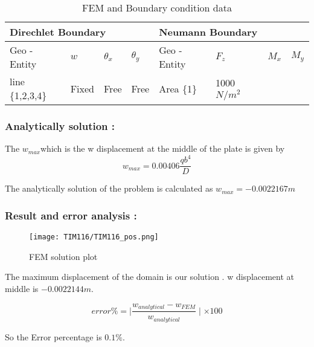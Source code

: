 \documentclass[VM.tex]{subfiles}
\begin{document}
\begin{table}[h!]
\renewcommand{\arraystretch}{1.5}
\centering
\caption{FEM and Boundary condition data}
\label{my-label}
\begin{tabular}{|l|lll|l|lll|}
\hline
 \multicolumn{4}{l|}{\cellcolor[HTML]{C0C0C0}Direchlet Boundary} & \multicolumn{4}{l|}{\cellcolor[HTML]{C0C0C0}Neumann Boundary} \\ \hline \hline
Geo - \newline Entity      & $w$          & $\theta _ x$     & $\theta _ y $    & Geo - \newline Entity         & $F_z$        & $M_x$        & $M_y$        \\    
                 line \{1,2,3,4\}                   & Fixed      & Free         & Free        & Area \{1\}                    & 1000 $N/m^2$        &           &          

 \\ \hline
\end{tabular}
\end{table}
\subsubsection*{Analytically solution : }
The $w_{max}$which is the w displacement at the middle of the plate is given by
\begin{equation}
w_{max}=0.00406 \frac{qb^4}{D}
\end{equation}


The analytically solution of the problem is calculated as $w_{max} =-0.0022167 m $

\subsubsection*{Result and error analysis : }

\begin{figure}[h!]
\centering
{}%
  \texttt{[image: TIM116/TIM116\_pos.png]}
  \caption{FEM solution plot}\label{fig:awesome_image3}
\endminipage
\end{figure}
The maximum displacement of the domain is our solution . w displacement at middle is $ -0.0022144 m $.


\begin{equation}
error \% = \mid \frac{w_{analytical}-w_{FEM}}{w_{analytical}} \mid \times 100
\end{equation}

So the Error percentage is $ 0.1 \% $. 
\end{document}
